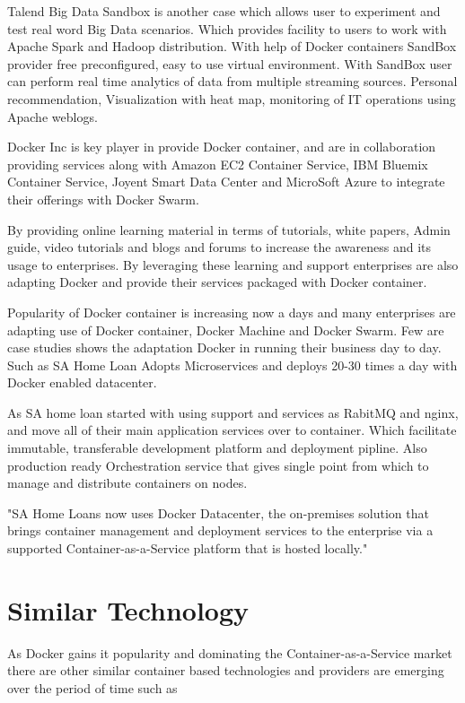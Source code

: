 \documentclass[9pt,twocolumn,twoside]{../../styles/osajnl}
\begin{document}
Talend Big Data Sandbox is another case which allows user to experiment and test real word Big Data scenarios. Which provides facility to users to work with Apache Spark and Hadoop distribution. With help of Docker containers SandBox provider free preconfigured, easy to use virtual environment. With SandBox user can perform real time analytics of data from multiple streaming sources. Personal recommendation, Visualization with heat map, monitoring of IT operations using Apache weblogs.\cite{SandBox}

Docker Inc is key player in provide Docker container, and are in collaboration providing services along with Amazon EC2 Container Service, IBM Bluemix Container Service, Joyent Smart Data Center and MicroSoft Azure to integrate their offerings with Docker Swarm.

By providing online learning material in terms of tutorials, white papers, Admin guide, video tutorials and blogs and forums to increase the awareness and its usage to enterprises. By leveraging these learning and support enterprises are also adapting Docker and provide their services packaged with Docker container. 

Popularity of Docker container is increasing now a days and many enterprises are adapting use of Docker container, Docker Machine and Docker Swarm. Few are case studies shows the adaptation Docker in running their business day to day. Such as SA Home Loan Adopts Microservices and deploys 20-30 times a day with Docker enabled datacenter.

As SA home loan started with using support and services as RabitMQ and nginx, and move all of their main application services over to container. Which facilitate immutable, transferable development platform and deployment pipline. Also production ready Orchestration service that gives single point from which to manage and distribute containers on nodes.

"SA Home Loans now uses Docker Datacenter, the on-premises solution that brings container management and deployment services to the enterprise via a supported Container-as-a-Service platform that is hosted locally."
\cite{SA}

\section{Similar Technology}
As Docker gains it popularity and dominating the Container-as-a-Service market there are other similar container based technologies and providers are emerging over the period of time such as
\end{document}

